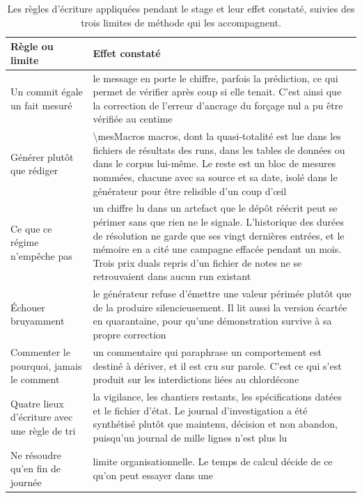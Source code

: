 \begin{table}[H]
  \centering
  \caption{Les règles d'écriture appliquées pendant le stage et leur effet constaté, suivies
  des trois limites de méthode qui les accompagnent.}
  \label{tab:ann-methode}
  \scriptsize
  \setlength{\tabcolsep}{4pt}
  \begin{tabularx}{\textwidth}{@{}p{34mm}X@{}}
    \toprule
    \textbf{Règle ou limite} & \textbf{Effet constaté} \\
    \midrule
    Un commit égale un fait mesuré &
      le message en porte le chiffre, parfois la prédiction, ce qui permet de vérifier après
      coup si elle tenait. C'est ainsi que la correction de l'erreur d'ancrage du forçage nul
      a pu être vérifiée au centime \\
    Générer plutôt que rédiger &
      \num{\mesMacros} macros, dont la quasi-totalité est lue dans les fichiers de résultats des
      runs, dans les tables de données ou dans le corpus lui-même. Le reste est un bloc de
      mesures nommées, chacune avec sa source et sa date, isolé dans le générateur pour être
      relisible d'un coup d'\oe il \\
    Ce que ce régime n'empêche pas &
      un chiffre lu dans un artefact que le dépôt réécrit peut se périmer sans que rien ne le
      signale. L'historique des durées de résolution ne garde que ses vingt dernières entrées,
      et le mémoire en a cité une campagne effacée pendant un mois. Trois prix duals repris
      d'un fichier de notes ne se retrouvaient dans aucun run existant \\
    Échouer bruyamment &
      le générateur refuse d'émettre une valeur périmée plutôt que de la produire
      silencieusement. Il lit aussi la version écartée en quarantaine, pour qu'une
      démonstration survive à sa propre correction \\
    Commenter le pourquoi, jamais le comment &
      un commentaire qui paraphrase un comportement est destiné à dériver, et il est cru sur
      parole. C'est ce qui s'est produit sur les interdictions liées au chlordécone \\
    Quatre lieux d'écriture avec une règle de tri &
      la vigilance, les chantiers restants, les spécifications datées et le fichier d'état. Le
      journal d'investigation a été synthétisé plutôt que maintenu, décision et non abandon,
      puisqu'un journal de mille lignes n'est plus lu \\
    \midrule
    Ne résoudre qu'en fin de journée &
      limite organisationnelle. Le temps de calcul décide de ce qu'on peut essayer dans une

\end{tabularx}
\end{table}
